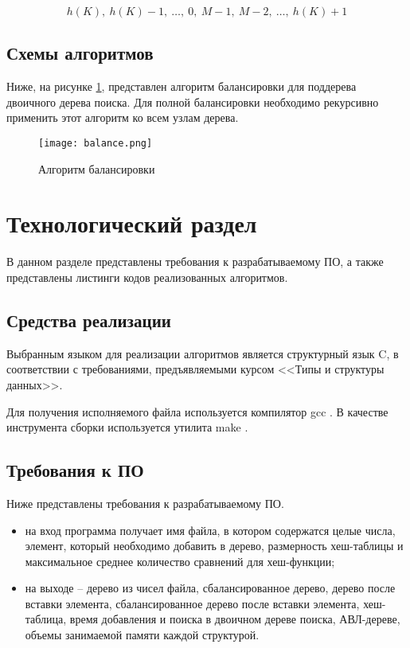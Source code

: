\begin{equation}
    h(K),~ h(K)-1,~ \dots,~ 0,~ M-1,~ M-2,~ \dots,~ h(K)+1
\end{equation}

\section{Схемы алгоритмов}

Ниже, на рисунке \ref{algo:balance}, представлен алгоритм балансировки для поддерева двоичного дерева поиска. Для полной балансировки необходимо рекурсивно применить этот алгоритм ко всем узлам дерева.

\begin{figure}
    \centering
    \texttt{[image: balance.png]}
    \caption{Алгоритм балансировки}
    \label{algo:balance}
\end{figure}

\chapter{Технологический раздел}

В данном разделе представлены требования к разрабатываемому ПО, а также представлены листинги кодов реализованных алгоритмов.

\section{Средства реализации}

Выбранным языком для реализации алгоритмов является структурный язык C, в соответствии с требованиями, предъявляемыми курсом <<Типы и структуры данных>>. 

Для получения исполняемого файла используется компилятор gcc \cite{gcc}. В качестве инструмента сборки используется утилита make \cite{make}.

\section{Требования к ПО}

Ниже представлены требования к разрабатываемому ПО.

\begin{itemize}[$\bullet$]
    \item на вход программа получает имя файла, в котором содержатся целые числа, элемент, который необходимо добавить в дерево, размерность хеш-таблицы и максимальное среднее количество сравнений для хеш-функции;
    \item на выходе -- дерево из чисел файла, сбалансированное дерево, дерево после вставки элемента, сбалансированное дерево после вставки элемента, хеш-таблица, время добавления и поиска в двоичном дереве поиска, АВЛ-дереве, объемы занимаемой памяти каждой структурой.
\end{itemize}

